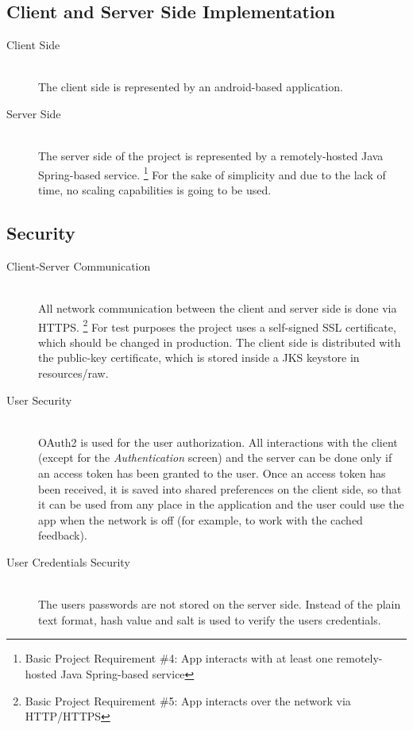 \documentclass{article}
\begin{document}
\newpage

    \subsection{Client and Server Side Implementation}
    
    \begin{description}
        \item[Client Side] \hfill \\
            The client side is represented by an android-based application.
        \item[Server Side] \hfill \\
            The server side of the project is represented by a remotely-hosted Java Spring-based service.
            \footnote{Basic Project Requirement \#4: App interacts with at least one remotely-hosted Java Spring-based service} 
            For the sake of simplicity and due to the lack of time, no scaling capabilities is going to be used.
    \end{description}

    \subsection{Security}

    \begin{description}
        \item[Client-Server Communication] \hfill \\
            All network communication between the client and server side is done via HTTPS.
            \footnote{Basic Project Requirement \#5: App interacts over the network via HTTP/HTTPS}
            For test purposes the project uses a self-signed SSL certificate, which should be changed in production. The client side is distributed with the public-key certificate, which is stored inside a JKS keystore in resources/raw. 
        \item[User Security] \hfill \\
            OAuth2 is used for the user authorization. All interactions with the client (except for the \emph{Authentication} screen) and the server can be done only if an access token has been granted to the user. Once an access token has been received, it is saved into shared preferences on the client side, so that it can be used from any place in the application and the user could use the app when the network is off (for example, to work with the cached feedback).
        \item[User Credentials Security] \hfill \\
            The users passwords are not stored on the server side. Instead of the plain text format, hash value and salt is used to verify the users credentials.
    \end{description}
\end{document}
